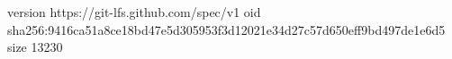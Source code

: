 version https://git-lfs.github.com/spec/v1
oid sha256:9416ca51a8ce18bd47e5d305953f3d12021e34d27c57d650eff9bd497de1e6d5
size 13230
